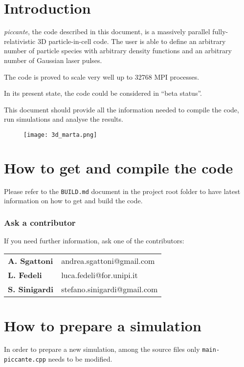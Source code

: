 \documentclass[11pt,a4paper]{report}
\begin{document}
\chapter{Introduction}
\emph{piccante}, the code described in this document, is a massively parallel fully-relativistic 3D particle-in-cell code. The user is able to define an arbitrary number of particle species with arbitrary density functions and an arbitrary number of Gaussian laser pulses.

The code is proved to scale very well up to 32768 MPI processes.

In its present state, the code could be considered in ``beta status''.

This document should provide all the information needed to compile the code, run simulations and analyse the results.
\begin{figure}[h!]
\centering
\texttt{[image: 3d\_marta.png]}
\end{figure}



\chapter{How to get and compile the code}
Please refer to the \verb+BUILD.md+ document in the project root folder to have latest information on how to get and build the code.

\subsection{Ask a contributor}
If you need further information, ask one of the contributors:
\begin{center}
    \begin{tabular}{ l | l }
    	\textbf{A. Sgattoni}  & andrea.sgattoni@gmail.com    \\
    	\textbf{L. Fedeli}    & luca.fedeli@for.unipi.it     \\
    	\textbf{S. Sinigardi} & stefano.sinigardi@gmail.com 
    \end{tabular}
\end{center}




\chapter{How to prepare a simulation}
In order to prepare a new simulation, among the source files only \verb+main-piccante.cpp+ needs to be modified.
\end{document}
